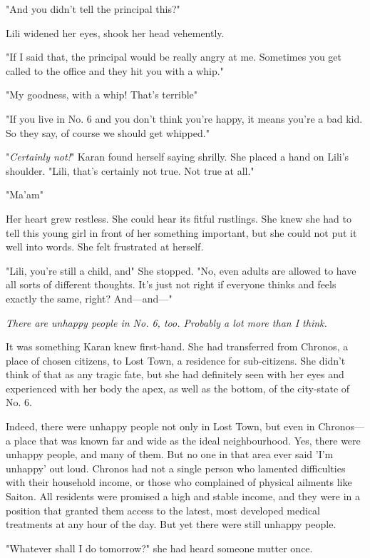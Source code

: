 "And you didn't tell the principal this?"

Lili widened her eyes, shook her head vehemently.

"If I said that, the principal would be really angry at me. Sometimes
you get called to the office and they hit you with a whip."

"My goodness, with a whip! That's terrible\el "

"If you live in No. 6 and you don't think you're happy, it means you're
a bad kid. So they say, of course we should get whipped."

"\emph{Certainly not!}" Karan found herself saying shrilly. She placed a hand
on Lili's shoulder. "Lili, that's certainly not true. Not true at all."

"Ma'am\el "

Her heart grew restless. She could hear its fitful rustlings. She knew
she had to tell this young girl in front of her something important, but
she could not put it well into words. She felt frustrated at herself.

"Lili, you're still a child, and\el " She stopped. "No, even adults are
allowed to have all sorts of different thoughts. It's just not right if
everyone thinks and feels exactly the same, right? And---and---"

\emph{There are unhappy people in No. 6, too. Probably a lot more than I
think.}

It was something Karan knew first-hand. She had transferred from
Chronos, a place of chosen citizens, to Lost Town, a residence for
sub-citizens. She didn't think of that as any tragic fate, but she had
definitely seen with her eyes and experienced with her body the apex, as
well as the bottom, of the city-state of No. 6.

Indeed, there were unhappy people not only in Lost Town, but even in
Chronos---a place that was known far and wide as the ideal neighbourhood.
Yes, there were unhappy people, and many of them. But no one in that
area ever said 'I'm unhappy' out loud. Chronos had not a single person
who lamented difficulties with their household income, or those who
complained of physical ailments like Saiton. All residents were promised
a high and stable income, and they were in a position that granted them
access to the latest, most developed medical treatments at any hour of
the day. But yet there were still unhappy people.

"Whatever shall I do tomorrow?" she had heard someone mutter once.

